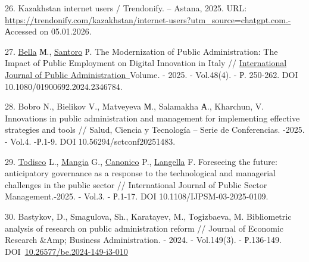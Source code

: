 \begin{refs}
26. Kazakhstan internet users / Trendonify. -- Astana, 2025. URL:
\url{https://trendonify.com/kazakhstan/internet-users?utm_source=chatgpt.com.-}
Аccessed on 05.01.2026.

27. \href{https://www.tandfonline.com/author/la+Bella\%2C+Marco+V+L}{Bella}
М.,
\href{https://www.tandfonline.com/author/Santoro\%2C+Patrizia}{Santoro}
Р. The Modernization of Public Administration: The Impact of Public
Employment on Digital Innovation in Italy //
\href{https://www.tandfonline.com/journals/lpad20}{International Journal
of Public Administration~}Volume\emph{.} - 2025. - Vol.48(4). - Р.
250-262. DOI 10.1080/01900692.2024.2346784.

28. Bobro N., Bielikov V., Matveyeva М., Salamakha А., Kharchun, V.
Innovations in public administration and management for implementing
effective strategies and tools // Salud, Ciencia y Tecnología -- Serie
de Conferencias. -2025. - Vol.4. -Р.1-9. DOI 10.56294/sctconf20251483.

29. \href{javascript:;}{Todisco} L., \href{javascript:;}{Mangia} G.,
\href{javascript:;}{Canonico} P., \href{javascript:;}{Langella} F.
Foreseeing the future: anticipatory governance as a response to the
technological and managerial challenges in the public sector //
International Journal of Public Sector Management.-2025. - Vol.3. -
Р.1-17. DOI 10.1108/IJPSM-03-2025-0109.

30. Bastykov, D., Smagulova, Sh., Karatayev, M., Тogizbaeva, M.
Bibliometric analysis of research on public administration reform //
Journal of Economic Research \&Amp; Business Administration. - 2024. -
Vol.149(3). - Р.136-149.
DOI~\href{https://doi.org/10.26577/be.2024-149-i3-010}{10.26577/be.2024-149-i3-010}
\end{refs}
\pagebreak
